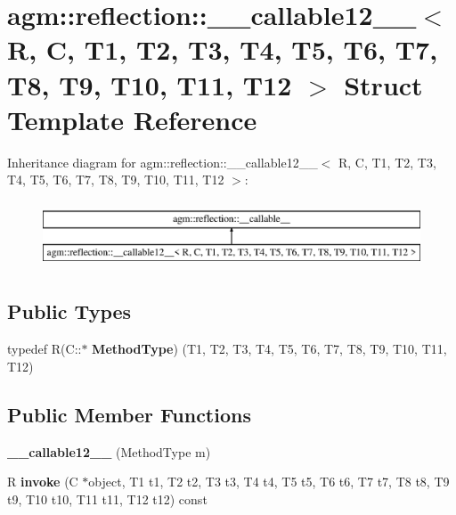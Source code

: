 \hypertarget{structagm_1_1reflection_1_1____callable12____}{}\section{agm\+:\+:reflection\+:\+:\+\_\+\+\_\+callable12\+\_\+\+\_\+$<$ R, C, T1, T2, T3, T4, T5, T6, T7, T8, T9, T10, T11, T12 $>$ Struct Template Reference}
\label{structagm_1_1reflection_1_1____callable12____}
Inheritance diagram for agm\+:\+:reflection\+:\+:\+\_\+\+\_\+callable12\+\_\+\+\_\+$<$ R, C, T1, T2, T3, T4, T5, T6, T7, T8, T9, T10, T11, T12 $>$\+:\begin{figure}[H]
\begin{center}
\leavevmode
\includegraphics[height=2.000000cm]{structagm_1_1reflection_1_1____callable12____}
\end{center}
\end{figure}
\subsection*{Public Types}
\begin{DoxyCompactItemize}
\item 
typedef R(C\+::$\ast$ {\bfseries Method\+Type}) (T1, T2, T3, T4, T5, T6, T7, T8, T9, T10, T11, T12)\hypertarget{structagm_1_1reflection_1_1____callable12_____ad1269dff3cf4995376114d18e1ababd2}{}\label{structagm_1_1reflection_1_1____callable12_____ad1269dff3cf4995376114d18e1ababd2}

\end{DoxyCompactItemize}
\subsection*{Public Member Functions}
\begin{DoxyCompactItemize}
\item 
{\bfseries \+\_\+\+\_\+callable12\+\_\+\+\_\+} (Method\+Type m)\hypertarget{structagm_1_1reflection_1_1____callable12_____a8198acc37a2a0107818cd8fca17a869b}{}\label{structagm_1_1reflection_1_1____callable12_____a8198acc37a2a0107818cd8fca17a869b}

\item 
R {\bfseries invoke} (C $\ast$object, T1 t1, T2 t2, T3 t3, T4 t4, T5 t5, T6 t6, T7 t7, T8 t8, T9 t9, T10 t10, T11 t11, T12 t12) const \hypertarget{structagm_1_1reflection_1_1____callable12_____ae1c5e0f7a424ff2d2de03fd1ba3c26c5}{}\label{structagm_1_1reflection_1_1____callable12_____ae1c5e0f7a424ff2d2de03fd1ba3c26c5}

\end{DoxyCompactItemize}
